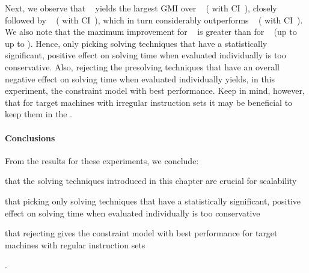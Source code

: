 Next, we observe that ~
yields the largest \gls{GMI} over ~ (\printGMI{%
  \SolvTechDisableAllBadPrePlusSolvingTimeSpeedupPrePlusSolvingTimeRegularSpeedupGmean%
} with \gls{CI}~\printGMICI{%
  \SolvTechDisableAllBadPrePlusSolvingTimeSpeedupPrePlusSolvingTimeRegularSpeedupCiMin%
}{%
  \SolvTechDisableAllBadPrePlusSolvingTimeSpeedupPrePlusSolvingTimeRegularSpeedupCiMax%
}), closely followed by ~
(\printGMI{%
  \SolvTechDisableAllPrePlusSolvingTimeSpeedupPrePlusSolvingTimeRegularSpeedupGmean%
} with \gls{CI}~\printGMICI{%
  \SolvTechDisableAllPrePlusSolvingTimeSpeedupPrePlusSolvingTimeRegularSpeedupCiMin%
}{%
  \SolvTechDisableAllPrePlusSolvingTimeSpeedupPrePlusSolvingTimeRegularSpeedupCiMax%
}),
which in turn considerably outperforms ~
(\printGMI{%
  \SolvTechEnableOnlyAllGoodPrePlusSolvingTimeSpeedupPrePlusSolvingTimeRegularSpeedupGmean%
} with \gls{CI}~\printGMICI{%
  \SolvTechEnableOnlyAllGoodPrePlusSolvingTimeSpeedupPrePlusSolvingTimeRegularSpeedupCiMin%
}{%
  \SolvTechEnableOnlyAllGoodPrePlusSolvingTimeSpeedupPrePlusSolvingTimeRegularSpeedupCiMax%
}).
%
We also note that the maximum improvement for ~ is greater than for ~ (up to \printZCNorm{%
  \SolvTechDisableAllBadPrePlusSolvingTimeSpeedupPrePlusSolvingTimeZeroCenteredSpeedupMax%
} \versus up to \printZCNorm{%
  \SolvTechDisableAllPrePlusSolvingTimeSpeedupPrePlusSolvingTimeZeroCenteredSpeedupMax
}).
%
Hence, only picking solving techniques that have a statistically significant,
positive effect on solving time when evaluated individually is too conservative.
%
Also, rejecting the \gls{presolving} techniques that have an overall negative
effect on solving time when evaluated individually yields, in this experiment,
the \gls{constraint model} with best performance.
%
Keep in mind, however, that for \glspl{target machine} with irregular
\glspl{instruction set} it may be beneficial to keep them in the
.


\paragraph{Conclusions}

From the results for these experiments, we conclude:
%
\begin{enumerate*}[label=(\roman*), itemjoin={;\ }, itemjoin*={; and\ }]
  \item that the solving techniques introduced in this chapter are crucial for
    scalability
  \item that picking only solving techniques that have a statistically
    significant, positive effect on solving time when evaluated individually is
    too conservative
  \item that rejecting  gives the \gls{constraint model} with best
    performance for \glspl{target machine} with regular \glspl{instruction set}
\end{enumerate*}.


